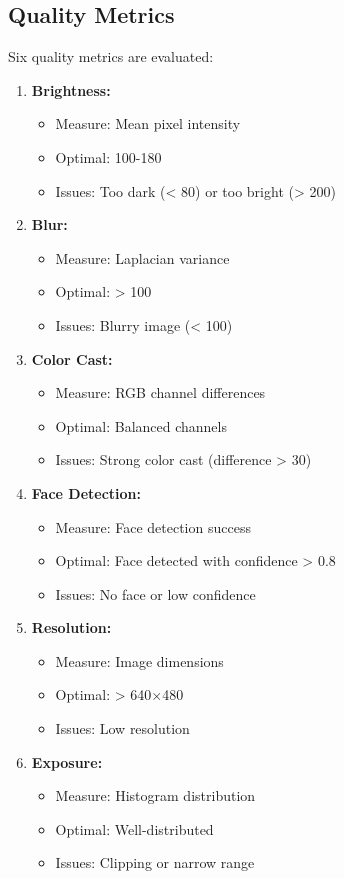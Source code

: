 \subsection{Quality Metrics}

Six quality metrics are evaluated:

\begin{enumerate}
    \item \textbf{Brightness:}
    \begin{itemize}
        \item Measure: Mean pixel intensity
        \item Optimal: 100-180
        \item Issues: Too dark (< 80) or too bright (> 200)
    \end{itemize}
    
    \item \textbf{Blur:}
    \begin{itemize}
        \item Measure: Laplacian variance
        \item Optimal: > 100
        \item Issues: Blurry image (< 100)
    \end{itemize}
    
    \item \textbf{Color Cast:}
    \begin{itemize}
        \item Measure: RGB channel differences
        \item Optimal: Balanced channels
        \item Issues: Strong color cast (difference > 30)
    \end{itemize}
    
    \item \textbf{Face Detection:}
    \begin{itemize}
        \item Measure: Face detection success
        \item Optimal: Face detected with confidence > 0.8
        \item Issues: No face or low confidence
    \end{itemize}
    
    \item \textbf{Resolution:}
    \begin{itemize}
        \item Measure: Image dimensions
        \item Optimal: > 640$\times$480
        \item Issues: Low resolution
    \end{itemize}
    
    \item \textbf{Exposure:}
    \begin{itemize}
        \item Measure: Histogram distribution
        \item Optimal: Well-distributed
        \item Issues: Clipping or narrow range
    \end{itemize}
\end{enumerate}

